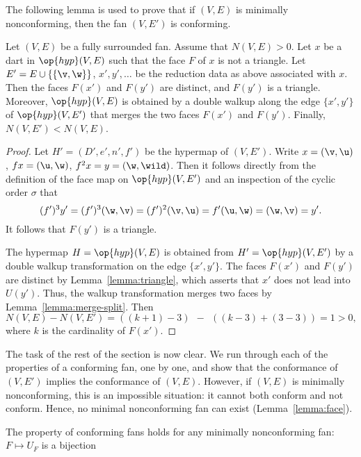 The following lemma is used to prove that if $(V,E)$ is minimally nonconforming,
then the fan $(V,E')$ is conforming.

\begin{lemma}[]\cutrate{}\label{lemma:lessN}
  Let $(V,E)$ be a fully surrounded fan.  Assume that $N(V,E)>0$.  Let
  $x$ be a dart in $\op{hyp}(V,E)$ such that the face $F$ of $x$ is
  not a triangle.  Let $E'=E\cup \{\{\v,\w\}\}$, $x',y',\ldots$ be the reduction data
  as above associated with $x$.  Then the faces $F(x')$ and $F(y')$ are distinct, and
  $F(y')$ is a
  triangle. Moreover, $\op{hyp}(V,E)$ is obtained by a double walkup along the
  edge $\{x',y'\}$ of $\op{hyp}(V,E')$ that merges the two faces $F(x')$ and $F(y')$.
  Finally, $N(V,E')<N(V,E)$.
\end{lemma}


\begin{proof} Let $H'=(D',e',n',f')$ be the hypermap of $(V,E')$.
Write $x = (\v,\u)$, $f x = (\u,\w)$, $f^2 x = y = (\w,\wild )$.
Then it follows directly from the definition of the face map on $\op{hyp}(V,E')$
and an inspection of the cyclic order $\sigma$ that
\[ 
(f')^3 y' = (f')^3 (\w,\v) = (f')^2(\v,\u) = f' (\u,\w) = (\w,\v) = y'.
\] 
It follows that $F(y')$ is a triangle.

The hypermap $H=\op{hyp}(V,E)$ is obtained from $H'=\op{hyp}(V,E')$ by
a double walkup transformation on the edge $\{x',y'\}$.  The faces
$F(x')$ and $F(y')$ are distinct by Lemma~\ref{lemma:triangle}, which
asserts that $x'$ does not lead into $U(y')$.  Thus, the walkup
transformation merges two faces by Lemma~\ref{lemma:merge-split}.
Then
\[ N(V,E) - N(V,E') = ((k+1)-3) ~~-~~ ((k-3) +
(3-3)) = 1 >0,\]  where $k$ is the cardinality of
$F(x')$.
\end{proof}

The task of the rest of the section is now clear.  We run through each
of the properties of a conforming fan, one by one, and show that the
conformance of $(V,E')$ implies the conformance of $(V,E)$.  However,
if $(V,E)$ is minimally nonconforming, this is an impossible
situation: it cannot both conform and not conform.  Hence, no minimal
nonconforming fan can exist (Lemma~\ref{lemma:face}).

\begin{lemma}[bijection]\cutrate{}
The property  of conforming fans holds for any
minimally nonconforming fan: $F\mapsto U_F$ is a bijection
\end{lemma}

